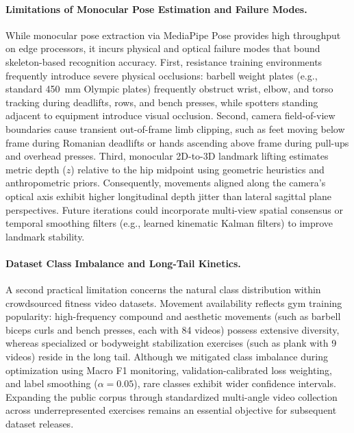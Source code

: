 \documentclass[runningheads]{llncs}
\begin{document}
\paragraph{Limitations of Monocular Pose Estimation and Failure Modes.}
While monocular pose extraction via MediaPipe Pose provides high throughput on edge processors, it incurs physical and optical failure modes that bound skeleton-based recognition accuracy. First, resistance training environments frequently introduce severe physical occlusions: barbell weight plates (e.g., standard 450~mm Olympic plates) frequently obstruct wrist, elbow, and torso tracking during deadlifts, rows, and bench presses, while spotters standing adjacent to equipment introduce visual occlusion. Second, camera field-of-view boundaries cause transient out-of-frame limb clipping, such as feet moving below frame during Romanian deadlifts or hands ascending above frame during pull-ups and overhead presses. Third, monocular 2D-to-3D landmark lifting estimates metric depth ($z$) relative to the hip midpoint using geometric heuristics and anthropometric priors. Consequently, movements aligned along the camera's optical axis exhibit higher longitudinal depth jitter than lateral sagittal plane perspectives. Future iterations could incorporate multi-view spatial consensus or temporal smoothing filters (e.g., learned kinematic Kalman filters) to improve landmark stability.

\paragraph{Dataset Class Imbalance and Long-Tail Kinetics.}
A second practical limitation concerns the natural class distribution within crowdsourced fitness video datasets. Movement availability reflects gym training popularity: high-frequency compound and aesthetic movements (such as barbell biceps curls and bench presses, each with 84 videos) possess extensive diversity, whereas specialized or bodyweight stabilization exercises (such as plank with 9 videos) reside in the long tail. Although we mitigated class imbalance during optimization using Macro F1 monitoring, validation-calibrated loss weighting, and label smoothing ($\alpha=0.05$), rare classes exhibit wider confidence intervals. Expanding the public corpus through standardized multi-angle video collection across underrepresented exercises remains an essential objective for subsequent dataset releases.
\end{document}
